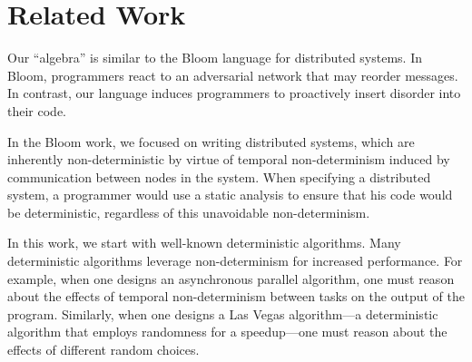 \section{Related Work}
\label{sec:relwork}

Our
``algebra'' is similar to the Bloom language for distributed systems.  In
Bloom, programmers react to an adversarial network that may reorder messages.  In contrast, our language induces programmers to proactively insert disorder into their code.

In the Bloom work, we focused on writing distributed systems, which are inherently non-deterministic by virtue of temporal non-determinism induced by communication between nodes in the system.  When specifying a distributed system, a programmer would use a static analysis to ensure that his code would be deterministic, regardless of this unavoidable non-determinism.~\cite{cidr11}

In this work, we start with well-known deterministic algorithms.  Many deterministic algorithms leverage non-determinism for increased performance.  For example, when one designs an asynchronous parallel algorithm, one must reason about the effects of temporal non-determinism between tasks on the output of the program.  Similarly, when one designs a Las Vegas algorithm---a deterministic algorithm that employs randomness for a speedup---one must reason about the effects of different random choices.

